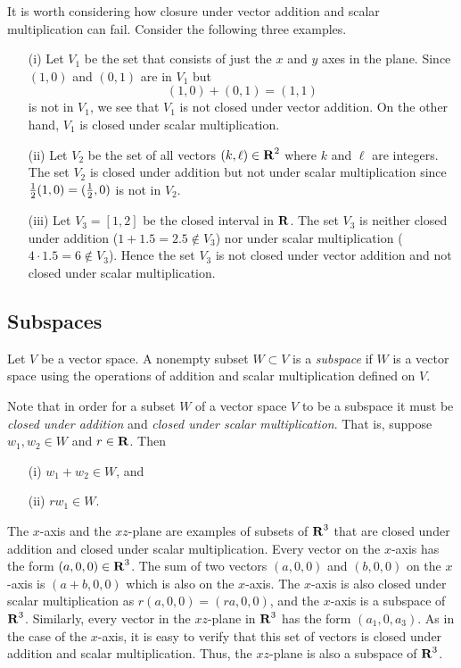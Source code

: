 It is worth considering how closure under vector addition and
scalar multiplication can fail.  Consider the following three
examples.

\begin{enumerate}
\item[(i)] Let $V_1$ be the set that consists of just the $x$
and $y$ axes in the plane.  Since $(1,0)$ and $(0,1)$ are in
$V_1$ but
\[
(1,0) + (0,1) = (1,1)
\]
is not in $V_1$, we see that $V_1$ is not closed under vector
addition. On the other hand, $V_1$ is closed under scalar
multiplication.  


\item[(ii)] Let $V_2$ be the set of all vectors $(k,\ell)\in\mbox{$\bf{R}$}^2$
where $k$ and $\ell$ are integers.  The set $V_2$ is closed under
addition but not under scalar multiplication since
$\mbox{$\frac{1}{2}$}(1,0)=(\mbox{$\frac{1}{2}$},0)$ is not in $V_2$.

\item[(iii)] Let $V_3=[1,2]$ be the closed interval in $\mbox{$\bf{R}$}$. The
set $V_3$ is neither closed under addition ($1+1.5=2.5\not\in
V_3$) nor under scalar multiplication ($4\cdot 1.5 = 6\not\in
V_3$).  Hence the set $V_3$ is not closed under vector addition
and not closed under scalar multiplication.
\end{enumerate}

\subsection*{Subspaces}

\begin{Def} \label{subspaces}
Let $V$ be a vector space.  A nonempty subset $W\subset V$ is a
{\em subspace\/} if $W$ is a vector space using the operations of 
addition and scalar multiplication defined on $V$.
\end{Def} 

Note that in order for a subset $W$ of a vector space $V$ to be a 
subspace it must be {\em closed under addition\/} and {\em closed under
scalar multiplication\/}.  That is, suppose $w_1,w_2\in W$ and 
$r\in\mbox{$\bf{R}$}$.  Then
\begin{itemize}
\item[(i)]  $w_1+w_2 \in W$, and
\item[(ii)]  $rw_1\in W$.
\end{itemize}
 

The $x$-axis and the $xz$-plane are examples of subsets of $\mbox{$\bf{R}$}^3$
that are closed under addition and closed under scalar multiplication.
Every vector on the $x$-axis has the form $(a,0,0)\in\mbox{$\bf{R}$}^3$.
The sum of two vectors $(a,0,0)$ and $(b,0,0)$ on the $x$-axis is
$(a+b,0,0)$ which is also on the $x$-axis.  The $x$-axis
is also closed under scalar multiplication as $r(a,0,0)=(ra,0,0)$,
and the $x$-axis is a subspace of $\mbox{$\bf{R}$}^3$.  Similarly, every vector
in the $xz$-plane in $\mbox{$\bf{R}$}^3$ has the form $(a_1,0,a_3)$. As in the
case of the $x$-axis, it is easy to verify that this set of vectors
is closed under addition and scalar multiplication.  Thus, the
$xz$-plane is also a subspace of $\mbox{$\bf{R}$}^3$.

